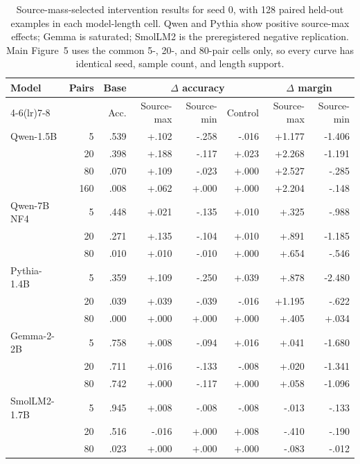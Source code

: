 \documentclass[letterpaper]{article} %
\begin{document}
\begin{table}[t]
\centering
\small
\setlength{\tabcolsep}{2.5pt}
\begin{tabular}{lrrrrrrr}
\toprule
Model & Pairs & Base & \multicolumn{3}{c}{$\Delta$ accuracy} & \multicolumn{2}{c}{$\Delta$ margin} \\
\cmidrule(lr){4-6}\cmidrule(lr){7-8}
& & Acc. & Source-max & Source-min & Control & Source-max & Source-min \\
\midrule
Qwen-1.5B & 5   & .539 & +.102 & -.258 & -.016 & +1.177 & -1.406 \\
& 20  & .398 & +.188 & -.117 & +.023 & +2.268 & -1.191 \\
& 80  & .070 & +.109 & -.023 & +.000 & +2.527 & -.285 \\
& 160 & .008 & +.062 & +.000 & +.000 & +2.204 & -.148 \\
\midrule
Qwen-7B NF4 & 5  & .448 & +.021 & -.135 & +.010 & +.325 & -.988 \\
& 20 & .271 & +.135 & -.104 & +.010 & +.891 & -1.185 \\
& 80 & .010 & +.010 & -.010 & +.000 & +.654 & -.546 \\
\midrule
Pythia-1.4B & 5  & .359 & +.109 & -.250 & +.039 & +.878 & -2.480 \\
& 20 & .039 & +.039 & -.039 & -.016 & +1.195 & -.622 \\
& 80 & .000 & +.000 & +.000 & +.000 & +.405 & +.034 \\
\midrule
Gemma-2-2B & 5  & .758 & +.008 & -.094 & +.016 & +.041 & -1.680 \\
& 20 & .711 & +.016 & -.133 & -.008 & +.020 & -1.341 \\
& 80 & .742 & +.000 & -.117 & +.000 & +.058 & -1.096 \\
\midrule
SmolLM2-1.7B & 5  & .945 & +.008 & -.008 & -.008 & -.013 & -.133 \\
& 20 & .516 & -.016 & +.000 & +.008 & -.410 & -.190 \\
& 80 & .023 & +.000 & +.000 & +.000 & -.083 & -.012 \\
\bottomrule
\end{tabular}
\caption{Source-mass-selected intervention results for seed 0, with 128 paired held-out examples in
each model-length cell. Qwen and Pythia show positive source-max effects; Gemma is saturated; SmolLM2 is the
preregistered negative replication. Main Figure~5 uses the common 5-, 20-, and 80-pair cells only, so every
curve has identical seed, sample count, and length support.}
\label{tab:supp-pretrained}
\end{table}
\end{document}
